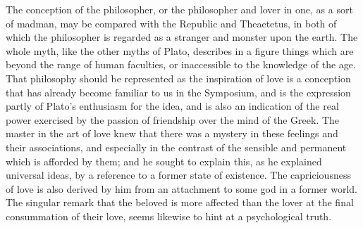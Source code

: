\documentclass[11pt,letter]{article}
\begin{document}
\par  The conception of the philosopher, or the philosopher and lover in one, as a sort of madman, may be compared with the Republic and Theaetetus, in both of which the philosopher is regarded as a stranger and monster upon the earth. The whole myth, like the other myths of Plato, describes in a figure things which are beyond the range of human faculties, or inaccessible to the knowledge of the age. That philosophy should be represented as the inspiration of love is a conception that has already become familiar to us in the Symposium, and is the expression partly of Plato's enthusiasm for the idea, and is also an indication of the real power exercised by the passion of friendship over the mind of the Greek. The master in the art of love knew that there was a mystery in these feelings and their associations, and especially in the contrast of the sensible and permanent which is afforded by them; and he sought to explain this, as he explained universal ideas, by a reference to a former state of existence. The capriciousness of love is also derived by him from an attachment to some god in a former world. The singular remark that the beloved is more affected than the lover at the final consummation of their love, seems likewise to hint at a psychological truth.
\end{document}
